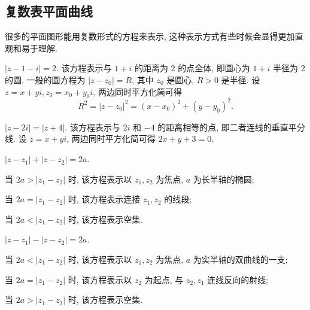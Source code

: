 \subsection{复数表平面曲线}

很多的平面图形能用复数形式的方程来表示, 这种表示方式有些时候会显得更加直观和易于理解.

\begin{example}\delspace
  \begin{enumnopar}[(i)]
    \item $|z-1-i|=2$. 该方程表示与 $1+i$ 的距离为 $2$ 的点全体, 即圆心为 $1+i$ 半径为 $2$ 的圆.
    一般的圆方程为 $|z-z_0|=R$, 其中 $z_0$ 是圆心, $R>0$ 是半径.
    设 $z=x+yi,z_0=x_0+y_0i$, 两边同时平方化简可得
    \[R^2=|z-z_0|^2=(x-x_0)^2+(y-y_0)^2.\]
    \item $|z-2i|=|z+4|$. 该方程表示与 $2i$ 和 $-4$ 的距离相等的点, 即二者连线的垂直平分线.
    设 $z=x+yi$, 两边同时平方化简可得 $2x+y+3=0$.
    \item $|z-z_1|+|z-z_2|=2a$.
    \begin{itemnopar}
      \item 当 $2a>|z_1-z_2|$ 时, 该方程表示以 $z_1,z_2$ 为焦点, $a$ 为长半轴的椭圆;
      \item 当 $2a=|z_1-z_2|$ 时, 该方程表示连接 $z_1,z_2$ 的线段;
      \item 当 $2a<|z_1-z_2|$ 时, 该方程表示空集.
    \end{itemnopar}
    \item $|z-z_1|-|z-z_2|=2a$.
    \begin{itemnopar}
      \item 当 $2a<|z_1-z_2|$ 时, 该方程表示以 $z_1,z_2$ 为焦点, $a$ 为实半轴的双曲线的一支;
      \item 当 $2a=|z_1-z_2|$ 时, 该方程表示以 $z_2$ 为起点, 与 $z_2,z_1$ 连线反向的射线;
      \item 当 $2a>|z_1-z_2|$ 时, 该方程表示空集.
    \end{itemnopar}
  \end{enumnopar}
\end{example}
